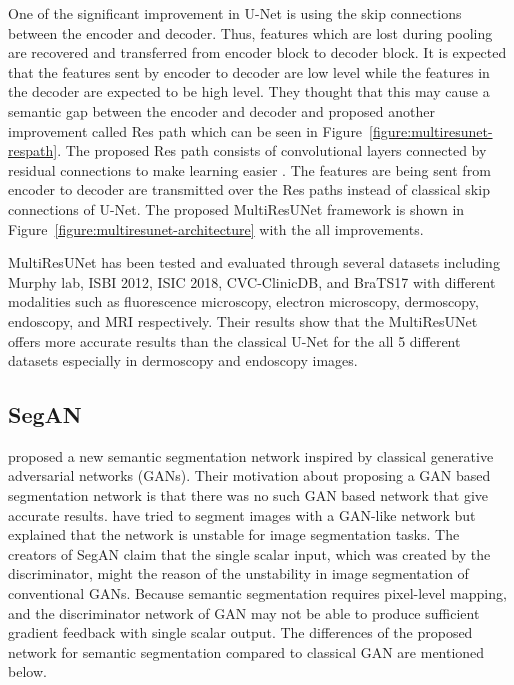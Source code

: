         One of the significant improvement in U-Net is using the skip connections between the encoder and decoder.
        Thus, features which are lost during pooling are recovered and transferred from encoder block to decoder block.
        It is expected that the features sent by encoder to decoder are low level while the features in the decoder are expected to be high level.
        They thought that this may cause a semantic gap between the encoder and decoder and proposed another improvement called Res path which can be seen in Figure~\ref{figure:multiresunet-respath}.
        The proposed Res path consists of convolutional layers connected by residual connections to make learning easier \cite{drozdzal2016importance}.
        The features are being sent from encoder to decoder are transmitted over the Res paths instead of classical skip connections of U-Net.
        The proposed MultiResUNet framework is shown in Figure~\ref{figure:multiresunet-architecture} with the all improvements.

        

        MultiResUNet has been tested and evaluated through several datasets including Murphy lab, ISBI 2012, ISIC 2018, CVC-ClinicDB, and BraTS17
        with different modalities such as fluorescence microscopy, electron microscopy, dermoscopy, endoscopy, and MRI respectively.
        Their results show that the MultiResUNet offers more accurate results than the classical U-Net for the all 5 different datasets especially in dermoscopy and endoscopy images.

    \subsection{SegAN}\label{section:segan}

        \citet{xue2018segan} proposed a new semantic segmentation network inspired by classical generative adversarial networks (GANs).
        Their motivation about proposing a GAN based segmentation network is that there was no such GAN based network that give accurate results.
        \citet{luc2016semantic} have tried to segment images with a GAN-like network but explained that the network is unstable for image segmentation tasks.
        The creators of SegAN claim that the single scalar input, which was created by the discriminator,  might the reason of the unstability in image segmentation of conventional GANs.
        Because semantic segmentation requires pixel-level mapping, and the discriminator network of GAN may not be able to produce sufficient gradient feedback with single scalar output.
        The differences of the proposed network for semantic segmentation compared to classical GAN ​​are mentioned below.

